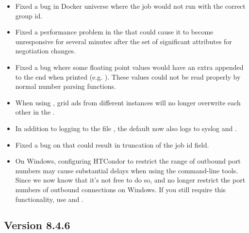 \begin{itemize}

\item Fixed a bug in Docker universe where the job would
not run with the correct group id.

\item Fixed a performance problem in the  that could
cause it to become unresponsive for several minutes after the
set of significant attributes for negotiation changes.

\item Fixed a bug where some floating point values would have an extra
 appended to the end when printed (e.g. ).
These values could not be read properly by normal number parsing functions.

\item When using , grid ads from
different  instances will no longer overwrite
each other in the .

\item In addition to logging to the file ,
the default  now also logs to
syslog and .

\item Fixed a bug on  that could result in truncation of
the job id field.

\item On Windows, configuring HTCondor to restrict the range of outbound
port numbers may cause substantial delays when using the command-line
tools.  Since we now know that it's not free to do so, 
and  no longer restrict the port numbers of outbound
connections on Windows.  If you still require this functionality, use
 and .

\end{itemize}

\subsection*{\label{sec:New-8-4-6}Version 8.4.6}


